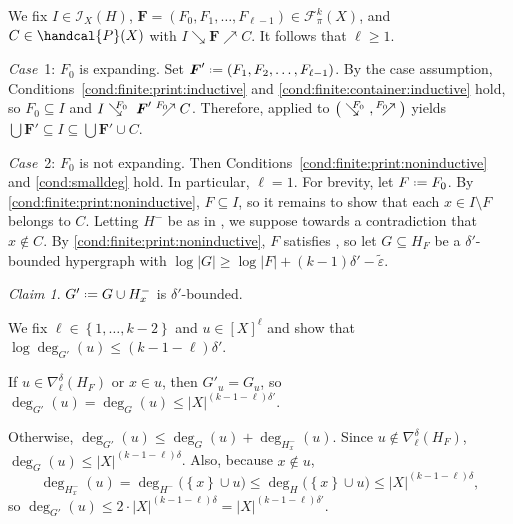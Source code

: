 \documentclass[12pt,reqno]{amsart}
\theoremstyle{plain}
\theoremstyle{definition}
\theoremstyle{remark}
\newtheorem{claim}[equation]{Claim}
\newenvironment{case}[2]{\smallskip\par\noindent \textit{Case}~#1: \rmfamily #2.}{}
\newcommand{\0}{\mathbb{\emptyset}}
\newcommand{\Pow}{\handcal{P}}
\newcommand{\set}[1]{\left\{ #1 \right\}}
\newcommand*{\defeq}{\mathrel{\vcenter{\baselineskip0.5ex \lineskiplimit0pt \hbox{\scriptsize.}\hbox{\scriptsize.}}}=}
\newcommand{\de}{\delta}
\newcommand{\e}{\varepsilon}
\newcommand{\FC}{\mathcal{F}}
\newcommand{\IC}{\mathcal{I}}
\newcommand{\Prints}[1][k]{\FC_\pi^{#1}(X)}
\newcommand{\Print}{\boldsymbol{F}}
\newcommand{\prel}{\searrow}
\newcommand{\crel}{\nearrow}
\newcommand{\prelG}[1]{\mathrel{\;\:\mathclap{\searrow}{{}^{#1}}\;}}
\newcommand{\crelG}[1]{\mathrel{{}^{#1}\mathclap{\nearrow}{\;\:}}}
\begin{document}
We fix $I \in \IC_X(H)$, $\Print = (F_0, F_1, \ldots, F_{\ell-1}) \in \Prints$, and $C \in \Pow(X)$ with $I \prel \Print \crel C$. It follows that $\ell \geq 1$.

\begin{case}{1}{$F_0$ is expanding}
	Set $\Print' \defeq (F_1, F_2, \ldots, F_{\ell-1})$. By the case assumption, Conditions~\ref{cond:finite:print:inductive} and \ref{cond:finite:container:inductive} hold, so $F_0 \subseteq I$ and $I \prelG{F_0} \Print' \crelG{F_0} C$. Therefore,  applied to $\big(\prelG{F_0}, \crelG{F_0}\big)$ yields $\bigcup \Print' \subseteq I \subseteq \bigcup \Print' \cup C$.
\end{case}

\begin{case}{2}{$F_0$ is not expanding}
	Then Conditions~\ref{cond:finite:print:noninductive} and \ref{cond:smalldeg} hold. In particular, $\ell = 1$. For brevity, let $F \defeq F_0$. By \cref{cond:finite:print:noninductive}, $F \subseteq I$, so it remains to show that each $x \in I \setminus F$ belongs to $C$. Letting $H^-$ be as in , we suppose towards a contradiction that $x \notin C$. By \cref{cond:finite:print:noninductive}, $F$ satisfies , so let $G \subseteq H_F$ be a $\de'$-bounded hypergraph with $\log |G| \ge \log |F| + (k-1) \de' - \tilde\e$.
	
	\begin{claim}
		$G' \defeq G \cup H^-_x$ is $\de'$-bounded.
	\end{claim}
	\begin{pf}
		We fix $\ell \in \set{1, \hdots, k-2}$ and $u \in [X]^\ell$ and show that $\log\deg_{G'}(u) \le (k - 1 - \ell) \de'$. 
		
		If $u \in \nabla_\ell^\de (H_F)$ or $x \in u$, then $G'_u = G_u$, so 
		$
		\deg_{G'}(u) = \deg_G(u) \le |X|^{(k - 1 - \ell) \de'}.
		$
		
		Otherwise, $\deg_{G'}(u) \le \deg_G(u) + \deg_{H^-_x}(u)$. Since $u \notin \nabla_\ell^\de (H_F)$, $\deg_G(u) \le |X|^{(k - 1 - \ell) \de}$. Also, because $x \notin u$,
		\[
		\deg_{H^-_x}(u) = \deg_{H^-} \big(\set{x} \cup u\big) \le \deg_H \big(\set{x} \cup u\big) \le |X|^{(k - 1 - \ell) \de},
		\]
		so $\deg_{G'}(u) \le 2 \cdot |X|^{(k - 1 - \ell) \de} = |X|^{(k - 1 - \ell) \de'}$.
	\end{pf}
	

\end{case}
\end{document}
